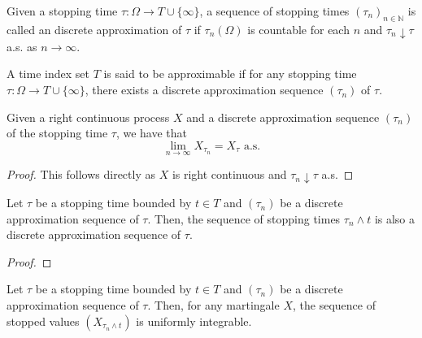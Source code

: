 \begin{definition}\label{def:approxSeq}
  \leanok
  Given a stopping time \(\tau : \Omega \to T \cup \{\infty\}\), a sequence of stopping times \((\tau_n)_{n \in \mathbb{N}}\) is called an
  discrete approximation of \(\tau\) if \(\tau_n(\Omega)\) is countable for each \(n\) and \(\tau_n \downarrow \tau\) a.s. as \(n \to \infty\).
\end{definition}

\begin{definition}\label{def:approximableTimeIndex}
  \leanok
  A time index set \(T\) is said to be approximable if for any stopping time \(\tau : \Omega \to T \cup \{\infty\}\), there exists a discrete approximation sequence \((\tau_n)\) of \(\tau\).
\end{definition}

\begin{lemma}\label{lem:tendsto_stoppedValue_discreteApproxSequence}
  \leanok
  Given a right continuous process \(X\) and a discrete approximation sequence \((\tau_n)\) of the stopping time \(\tau\), we have that
  \[\lim_{n \to \infty} X_{\tau_n} = X_\tau \text{ a.s.}\]
\end{lemma}

\begin{proof}
  \leanok
  This follows directly as \(X\) is right continuous and \(\tau_n \downarrow \tau\) a.s.
\end{proof}

\begin{lemma}\label{lem:discreteApproxSequence_of}
  \leanok
  Let \(\tau\) be a stopping time bounded by \(t \in T\) and \((\tau_n)\) be a discrete approximation sequence of \(\tau\).
  Then, the sequence of stopping times \(\tau_n \wedge t\) is also a discrete approximation sequence of \(\tau\).
\end{lemma}

\begin{proof}
  \leanok
\end{proof}

\begin{lemma}\label{lem:uniformIntegrable_stoppedValue_discreteApproxSequence}
  \leanok
  Let \(\tau\) be a stopping time bounded by \(t \in T\) and \((\tau_n)\) be a discrete approximation sequence of \(\tau\).
  Then, for any martingale \(X\), the sequence of stopped values \((X_{\tau_n \wedge t})\) is uniformly integrable.
\end{lemma}

